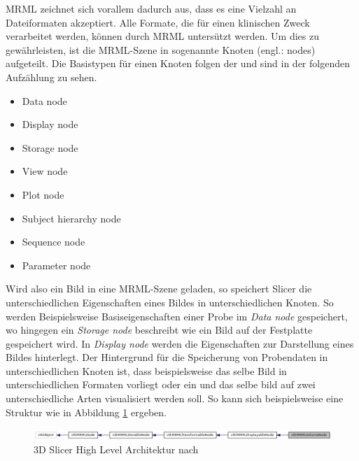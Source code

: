 \ac{MRML} zeichnet sich vorallem dadurch aus, dass es eine Vielzahl an
Dateiformaten akzeptiert. Alle Formate, die für einen klinischen Zweck
verarbeitet werden, können durch \ac{MRML} untersützt werden. Um dies zu gewährleisten,
ist die \ac{MRML}-Szene in sogenannte Knoten (engl.: nodes) aufgeteilt. Die
Basistypen für einen Knoten folgen der \citet{slicer2024} und sind in der folgenden
Aufzählung zu sehen.

\begin{minipage}{0.45\textwidth}
	\begin{itemize}
		\item Data node

		\item Display node

		\item Storage node

		\item View node
	\end{itemize}
\end{minipage}
\hfill
\begin{minipage}{0.45\textwidth}
	\begin{itemize}
		\item Plot node

		\item Subject hierarchy node

		\item Sequence node

		\item Parameter node
	\end{itemize}
\end{minipage}

Wird also ein Bild in eine \ac{MRML}-Szene geladen, so speichert Slicer die
unterschiedlichen Eigenschaften eines Bildes in unterschiedlichen Knoten. So werden
Beispielsweise Basiseigenschaften einer Probe im \textit{Data node} gespeichert,
wo hingegen ein \textit{Storage node} beschreibt wie ein Bild auf der Festplatte
gespeichert wird. In \textit{Display node} werden die Eigenschaften zur
Darstellung eines Bildes hinterlegt. Der Hintergrund für die Speicherung von Probendaten
in unterschiedlichen Knoten ist, dass beispielsweise das selbe Bild in
unterschiedlichen Formaten vorliegt oder ein und das selbe bild auf zwei
unterschiedliche Arten visualisiert werden soll. So kann sich beispielsweise eine
Struktur wie in Abbildung \ref{fig:3d_slicer_class} ergeben.

\begin{figure}[h]
	\centering
	\includegraphics[width=1\textwidth]{img/slicer_class_index.jpg}
	\caption{3D Slicer High Level Architektur nach \citet{slicer2024}}
	\label{fig:3d_slicer_class}
\end{figure}

